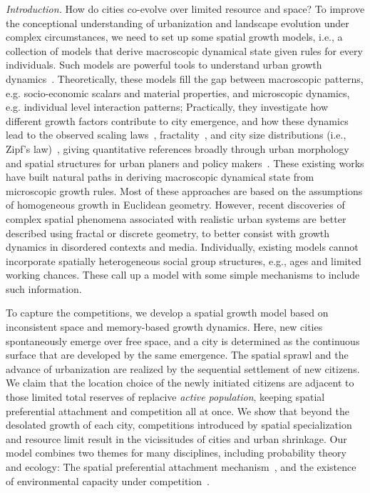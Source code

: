 \documentclass[reprint,unsortedaddress,amsmath,amssymb,aps,prl,showkeys]{revtex4-2}
\begin{document}
\textit{Introduction.} How do cities co-evolve over limited resource and space? To improve the conceptional understanding of urbanization and landscape evolution under complex circumstances, we need to set up some spatial growth models, i.e., a collection of models that derive macroscopic dynamical state given rules for every individuals. Such models are powerful tools to understand urban growth dynamics~\cite{PhysRevX.4.011008, Li2017Simple, makse1995modelling, rybski2013distance, nanda2017spatial}. Theoretically, these models fill the gap between macroscopic patterns, e.g. socio-economic scalars and material properties, and microscopic dynamics, e.g. individual level interaction patterns; Practically, they investigate how different growth factors contribute to city emergence, and how these dynamics lead to the observed scaling laws~\cite{bettencourt2007growth,court2013origins,batty2008size,batty2019urbanscalinglaw}, fractality~\cite{batty1994fractal,batty2007cities}, and city size distributions (i.e., Zipf's law)~\cite{zipf1949human}, giving quantitative references broadly through urban morphology and spatial structures for urban planers and policy makers~\cite{anas1998urban}. These existing works have built natural paths in deriving macroscopic dynamical state from microscopic growth rules. Most of these approaches are based on the assumptions of homogeneous growth in Euclidean geometry. However, recent discoveries of complex spatial phenomena associated with realistic urban systems are better described using fractal or discrete geometry\cite{makse1995modelling,louf2014congestion,PhysRevE.58.7054}, to better consist with growth dynamics in disordered contexts and media. Individually, existing models cannot incorporate spatially heterogeneous social group structures, e.g., ages\cite{PhysRevE.93.012112} and limited working chances. These call up a model with some simple mechanisms to include such information.

To capture the competitions, we develop a spatial growth model based on inconsistent space and memory-based growth dynamics. Here, new cities spontaneously emerge over free space, and a city is determined as the continuous surface that are developed by the same emergence. The spatial sprawl and the advance of urbanization are realized by the sequential settlement of new citizens. We claim that the location choice of the newly initiated citizens are adjacent to those limited total reserves of replacive \textit{active population}, keeping spatial preferential attachment and competition all at once. We show that beyond the desolated growth of each city, competitions introduced by spatial specialization and resource limit result in the vicissitudes of cities and urban shrinkage. Our model combines two themes for many disciplines, including probability theory and ecology: The spatial preferential attachment mechanism~\cite{Li2017Simple}, and the existence of environmental capacity under competition~\cite{gude2020bacterial,liu2019an}. 
\end{document}
